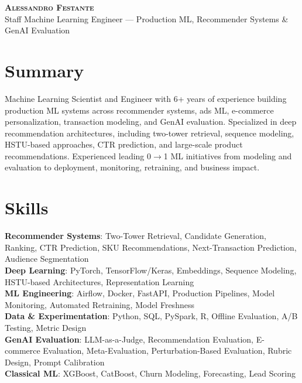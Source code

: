 \documentclass[letterpaper,11pt]{article}
\begin{document}
\begin{center}
    \textbf{\Huge \scshape Alessandro Festante} \\ \vspace{2pt}
    \small Staff Machine Learning Engineer --- Production ML, Recommender Systems \& GenAI Evaluation
\end{center}

\section{Summary}
\small{Machine Learning Scientist and Engineer with 6+ years of experience building production ML systems across recommender systems, ads ML, e-commerce personalization, transaction modeling, and GenAI evaluation. Specialized in deep recommendation architectures, including two-tower retrieval, sequence modeling, HSTU-based approaches, CTR prediction, and large-scale product recommendations. Experienced leading 0$\rightarrow$1 ML initiatives from modeling and evaluation to deployment, monitoring, retraining, and business impact.}\vspace{-6pt}

\section{Skills}
 \begin{itemize}[leftmargin=0.15in, label={}]
    \small{\item{
     \textbf{Recommender Systems}{: Two-Tower Retrieval, Candidate Generation, Ranking, CTR Prediction, SKU Recommendations, Next-Transaction Prediction, Audience Segmentation} \\
     \textbf{Deep Learning}{: PyTorch, TensorFlow/Keras, Embeddings, Sequence Modeling, HSTU-based Architectures, Representation Learning} \\
     \textbf{ML Engineering}{: Airflow, Docker, FastAPI, Production Pipelines, Model Monitoring, Automated Retraining, Model Freshness} \\
     \textbf{Data \& Experimentation}{: Python, SQL, PySpark, R, Offline Evaluation, A/B Testing, Metric Design} \\
     \textbf{GenAI Evaluation}{: LLM-as-a-Judge, Recommendation Evaluation, E-commerce Evaluation, Meta-Evaluation, Perturbation-Based Evaluation, Rubric Design, Prompt Calibration} \\
     \textbf{Classical ML}{: XGBoost, CatBoost, Churn Modeling, Forecasting, Lead Scoring}
    }}
 \end{itemize}
\end{document}
